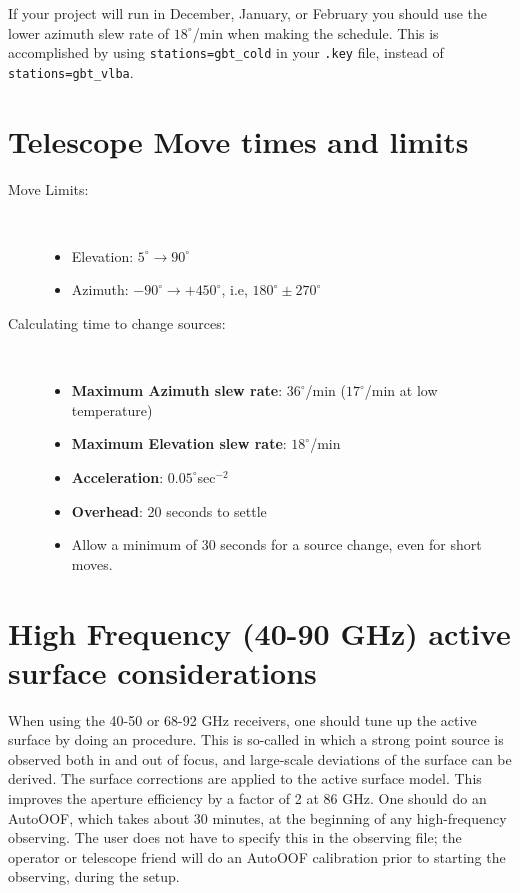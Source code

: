 If your project will run in December, January, or February you should use the
lower azimuth slew rate of $18^{\circ}$/min when making the schedule. This is
accomplished by using {\tt stations=gbt\_cold} in your {\tt.key} file, instead
of {\tt stations=gbt\_vlba}.

\section{Telescope Move times and limits}
\begin{description}
\item[Move Limits:]\ 
\begin{itemize}
\item Elevation: $5^{\circ} \rightarrow 90^{\circ} $
\item Azimuth: $-90^{\circ} \rightarrow +450^{\circ}$,
i.e, $180^{\circ} \pm 270^{\circ} $
\end{itemize}
\item[Calculating time to change sources:]\ 
\begin{itemize}
\item {\bf Maximum Azimuth slew rate}: $36^{\circ}$/min ($17^{\circ}$/min at low
temperature)
\item {\bf Maximum Elevation slew rate}: $18^{\circ}$/min
\item {\bf Acceleration}: $0.05^{\circ}$sec$^{-2}$
\item {\bf Overhead}: 20 seconds to settle
\item Allow a minimum of 30 seconds for a source change, even for short moves.
\end{itemize}
\end{description}

\section[High Frequency (40-90 GHz) active surface considerations]
{High Frequency (40-90 GHz) active\\ surface considerations}

When using the 40-50 or 68-92 GHz receivers, one should tune up the active
surface by doing an  procedure. This is so-called \dq{Out of focus
holography} in which a strong point source is observed both in and out of
focus, and large-scale deviations of the surface can be derived. The surface
corrections are applied to the active surface model. This improves the
aperture efficiency by a factor of 2 at 86 GHz. One should do an AutoOOF,
which takes about 30 minutes, at the beginning of any high-frequency
observing. The user does not have to specify this in the observing file;
the operator or telescope friend will do an AutoOOF calibration prior to
starting the observing, during the setup.

